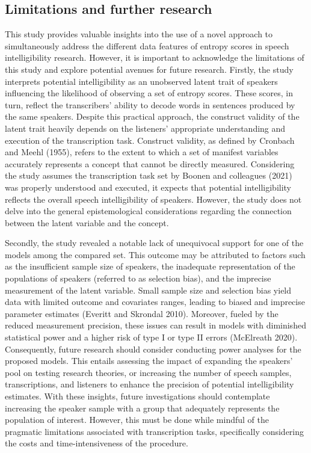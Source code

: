 \documentclass[
sn-apacite
]{sn-jnl}
\begin{document}
\subsection{Limitations and further research}\label{sec-D-LFR}

This study provides valuable insights into the use of a novel approach
to simultaneously address the different data features of entropy scores
in speech intelligibility research. However, it is important to
acknowledge the limitations of this study and explore potential avenues
for future research. Firstly, the study interprets potential
intelligibility as an unobserved latent trait of speakers influencing
the likelihood of observing a set of entropy scores. These scores, in
turn, reflect the transcribers' ability to decode words in sentences
produced by the same speakers. Despite this practical approach, the
construct validity of the latent trait heavily depends on the listeners'
appropriate understanding and execution of the transcription task.
Construct validity, as defined by Cronbach and Meehl (1955), refers to
the extent to which a set of manifest variables accurately represents a
concept that cannot be directly measured. Considering the study assumes
the transcription task set by Boonen and colleagues (2021) was properly
understood and executed, it expects that potential intelligibility
reflects the overall speech intelligibility of speakers. However, the
study does not delve into the general epistemological considerations
regarding the connection between the latent variable and the concept.

Secondly, the study revealed a notable lack of unequivocal support for
one of the models among the compared set. This outcome may be attributed
to factors such as the insufficient sample size of speakers, the
inadequate representation of the populations of speakers (referred to as
selection bias), and the imprecise measurement of the latent variable.
Small sample size and selection bias yield data with limited outcome and
covariates ranges, leading to biased and imprecise parameter estimates
(Everitt and Skrondal 2010). Moreover, fueled by the reduced measurement
precision, these issues can result in models with diminished statistical
power and a higher risk of type I or type II errors (McElreath 2020).
Consequently, future research should consider conducting power analyses
for the proposed models. This entails assessing the impact of expanding
the speakers' pool on testing research theories, or increasing the
number of speech samples, transcriptions, and listeners to enhance the
precision of potential intelligibility estimates. With these insights,
future investigations should contemplate increasing the speaker sample
with a group that adequately represents the population of interest.
However, this must be done while mindful of the pragmatic limitations
associated with transcription tasks, specifically considering the costs
and time-intensiveness of the procedure.
\end{document}
